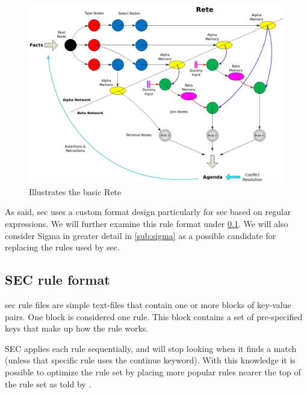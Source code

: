 \begin{figure}[ht]  %
  \centering
  \includegraphics[width=\textwidth]{figures/rete-image.png}
  \caption[Illustrates the basic Rete]{Illustrates the basic Rete\cite{reteimage}}
  \label{fig:rete}
\end{figure}

As said, \acrfull{sec} uses a custom format design particularly for \acrshort{sec} based on regular expressions. We will further examine this rule format under \cref{sub:sec-rule-format}. We will also consider Sigma in greater detail in \cref{sub:sigma} as a possible candidate for replacing the rules used by \acrshort{sec}.

\subsection{SEC rule format}
\label{sub:sec-rule-format}
\acrshort{sec} rule files are simple text-files that contain one or more blocks of key-value pairs. One block is considered one rule. This block contains a set of pre-specified keys that make up how the rule works.

SEC applies each rule sequentially, and will stop looking when it finds a match (unless that specific rule uses the continue keyword). With this knowledge it is possible to optimize the rule set by placing more popular rules nearer the top of the rule set as told by \textcite{rouillard2004real}.

